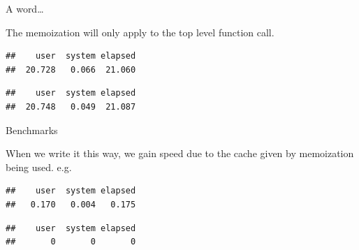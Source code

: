\begin{frame}[fragile]{A word\ldots{}}

The memoization will only apply to the top level function call.

\begin{Shaded}
\begin{Highlighting}[]
\NormalTok{(\{}\NormalTok{(}\NormalTok{)\}) }
\end{Highlighting}
\end{Shaded}

\begin{verbatim}
##    user  system elapsed 
##  20.728   0.066  21.060
\end{verbatim}

\begin{Shaded}
\begin{Highlighting}[]
\NormalTok{(\{}\NormalTok{(}\NormalTok{)\})   }
\end{Highlighting}
\end{Shaded}

\begin{verbatim}
##    user  system elapsed 
##  20.748   0.049  21.087
\end{verbatim}

\end{frame}

\begin{frame}[fragile]{Benchmarks}

When we write it this way, we gain speed due to the cache given by
memoization being used. e.g.

\begin{Shaded}
\begin{Highlighting}[]
\NormalTok{(\{}\NormalTok{(}\NormalTok{)\})   }
\end{Highlighting}
\end{Shaded}

\begin{verbatim}
##    user  system elapsed 
##   0.170   0.004   0.175
\end{verbatim}

\begin{Shaded}
\begin{Highlighting}[]
\NormalTok{(\{}\NormalTok{(}\NormalTok{)\})   }
\end{Highlighting}
\end{Shaded}

\begin{verbatim}
##    user  system elapsed 
##       0       0       0
\end{verbatim}

\end{frame}

